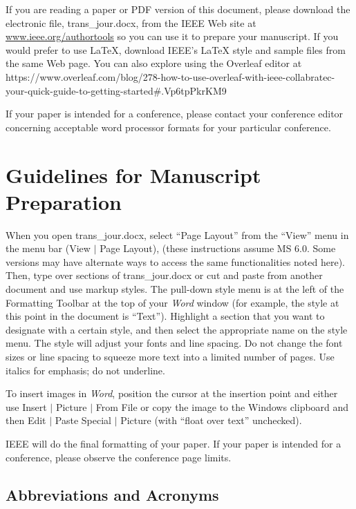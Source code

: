 \documentclass[journal]{IEEEtai}
\begin{document}
If you are reading a paper or PDF version of this document, please download the electronic file, trans\_jour.docx, from the IEEE Web site at \href{http://www.ieee.org/authortools}{www.ieee.org/authortools} so you can use it to prepare your manuscript. If you would prefer to use \LaTeX, download IEEE's  {\LaTeX} style and sample files from the same Web page. You can also explore using the Overleaf editor at {https://www.overleaf.com/blog/278-how-to-use-overleaf-with-ieee-collabratec-your-quick-guide-to-getting-started\#.Vp6tpPkrKM9}

If your paper is intended for a conference, please contact your conference editor concerning acceptable word processor formats for your particular conference.

\section{Guidelines for Manuscript Preparation}

When you open trans\_jour.docx, select ``Page Layout'' from the ``View'' menu in the menu bar (View $|$ Page Layout), (these instructions assume MS 6.0. Some versions may have alternate ways to access the same functionalities noted here). Then, type over sections of trans\_jour.docx or cut and paste from another document and use markup styles. The pull-down style menu is at the left of the Formatting Toolbar at the top of your {\it Word} window (for example, the style at this point in the document is ``Text''). Highlight a section that you want to designate with a certain style, and then select the appropriate name on the style menu. The style will adjust your fonts and line spacing. Do not change the font sizes or line spacing to squeeze more text into a limited number of pages. Use italics for emphasis; do not underline.

To insert images in {\it Word}, position the cursor at the insertion point and either use Insert $|$ Picture $|$ From File or copy the image to the Windows clipboard and then Edit $|$ Paste Special $|$ Picture (with ``float over text'' unchecked). 

IEEE will do the final formatting of your paper. If your paper is intended for a conference, please observe the conference page limits.

\subsection{Abbreviations and Acronyms}
\end{document}
